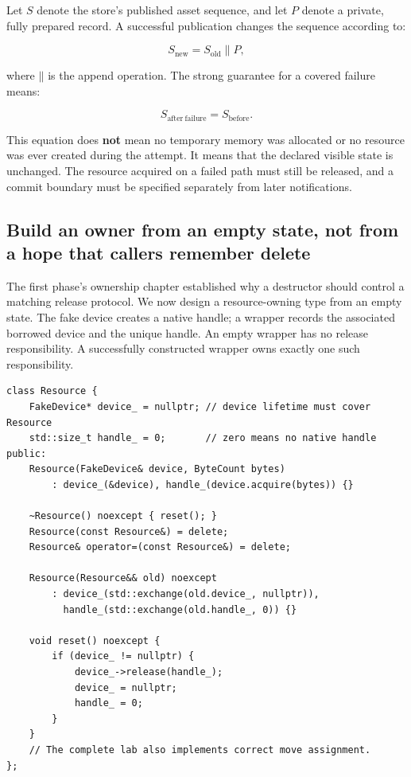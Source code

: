 Let \(S\) denote the store's published asset sequence, and let \(P\) denote a private, fully prepared record. A successful publication changes the sequence according to:

\[
S_{\mathrm{new}} = S_{\mathrm{old}} \mathbin{\|} P,
\]

where \(\mathbin{\|}\) is the append operation. The strong guarantee for a covered failure means:

\[
S_{\mathrm{after\ failure}} = S_{\mathrm{before}}.
\]

This equation does \textbf{not} mean no temporary memory was allocated or no resource was ever created during the attempt. It means that the declared visible state is unchanged. The resource acquired on a failed path must still be released, and a commit boundary must be specified separately from later notifications.

\subsection{Build an owner from an empty state, not from a hope that callers remember delete}\label{01-foundations-i-ch004-build-an-owner-from-an-empty-state-not-from-a-hope-that-callers-remember-delete}

\hypertarget{01-foundations-i-ch004-build-an-owner-from-an-empty-state-not-from-a-hope-that-callers-remember-delete}{}

The first phase's ownership chapter established why a destructor should control a matching release protocol. We now design a resource-owning type from an empty state. The fake device creates a native handle; a wrapper records the associated borrowed device and the unique handle. An empty wrapper has no release responsibility. A successfully constructed wrapper owns exactly one such responsibility.

\begin{verbatim}
class Resource {
    FakeDevice* device_ = nullptr; // device lifetime must cover Resource
    std::size_t handle_ = 0;       // zero means no native handle
public:
    Resource(FakeDevice& device, ByteCount bytes)
        : device_(&device), handle_(device.acquire(bytes)) {}

    ~Resource() noexcept { reset(); }
    Resource(const Resource&) = delete;
    Resource& operator=(const Resource&) = delete;

    Resource(Resource&& old) noexcept
        : device_(std::exchange(old.device_, nullptr)),
          handle_(std::exchange(old.handle_, 0)) {}

    void reset() noexcept {
        if (device_ != nullptr) {
            device_->release(handle_);
            device_ = nullptr;
            handle_ = 0;
        }
    }
    // The complete lab also implements correct move assignment.
};
\end{verbatim}

